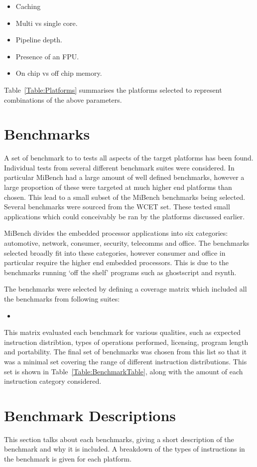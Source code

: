 \documentclass[twocolumn]{article}
\newcommand{\nsection}[1]{\section{\bfseries #1}}
\begin{document}
\begin{itemize}
	\setlength{\itemsep}{-0.25em}
	\item Caching
	\item Multi vs single core.
	\item Pipeline depth.
	\item Presence of an FPU.
	\item On chip vs off chip memory.
\end{itemize}

Table~\ref{Table:Platforms} summarises the platforms selected to represent combinations of the above parameters.

\nsection{Benchmarks}

A set of benchmark to to tests all aspects of the target platforms has been found. Individual tests from several different benchmark suites were considered. In particular MiBench had a large amount of well defined benchmarks, however a large proportion of these were targeted at much higher end platforms than chosen. This lead to a small subset of the MiBench benchmarks being selected. Several benchmarks were sourced from the WCET set. These tested small applications which could conceivably be ran by the platforms discussed earlier.

MiBench divides the embedded processor applications into six categories: automotive, network, consumer, security, telecomms and office. The benchmarks selected broadly fit into these categories, however consumer and office in particular require the higher end embedded processors. This is due to the benchmarks running `off the shelf' programs such as ghostscript and rsynth.

The benchmarks were selected by defining a coverage matrix which included all the benchmarks from following suites:
\begin{itemize}
	\item
\end{itemize}

This matrix evaluated each benchmark for various qualities, such as expected instruction distribtion, types of operations performed, licensing, program length and portability. The final set of benchmarks was chosen from this list so that it was a minimal set covering the range of different instruction distributions. This set is shown in Table~\ref{Table:BenchmarkTable}, along with the amount of each instruction category considered.


\nsection{Benchmark Descriptions}

This section talks about each benchmarks, giving a short description of the benchmark and why it is included. A breakdown of the types of instructions in the benchmark is given for each platform.
\end{document}
